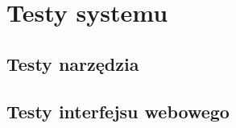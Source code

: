 \documentclass[../thesis.tex]{subfiles}
\begin{document}
\pagestyle{plain}
\chapter{Testy systemu}
\section{Testy narzędzia}
\section{Testy interfejsu webowego}
\end{document}

